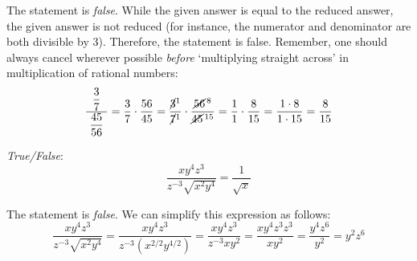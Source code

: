 \documentclass[11pt,letterpaper]{article}
\begin{document}
\sol The statement is \textit{false}. While the given answer is equal to the reduced answer, the given answer is not reduced (for instance, the numerator and denominator are both divisible by 3). Therefore, the statement is false. Remember, one should always cancel wherever possible \textit{before} `multiplying straight across' in multiplication of rational numbers:
	\[
	\dfrac{\;\;\dfrac{3}{7}\;\;}{\dfrac{45}{56}}= \dfrac{3}{7} \cdot \dfrac{56}{45}= \dfrac{\cancel{3}^1}{\cancel{7}^1} \cdot \dfrac{\cancel{56}^{\,8}}{\cancel{45}^{\,15}}= \dfrac{1}{1} \cdot \dfrac{8}{15}= \dfrac{1 \cdot 8}{1 \cdot 15}= \dfrac{8}{15}
	\] 





\newpage





\quizsol \textit{True/False}: 
	\[
	\dfrac{x y^4 z^3}{z^{-3} \sqrt{x^2 y^4}}= \dfrac{1}{\sqrt{x}}
	\] \pspace

\sol The statement is \textit{false}. We can simplify this expression as follows:
	\[
	\dfrac{x y^4 z^3}{z^{-3} \sqrt{x^2 y^4}}= \dfrac{x y^4 z^3}{z^{-3} (x^{2/2} y^{4/2})}= \dfrac{x y^4 z^3}{z^{-3} x y^2}= \dfrac{x y^4 z^3 z^3}{x y^2}= \dfrac{y^4 z^6}{y^2}= y^2 z^6
	\]




\end{document}
